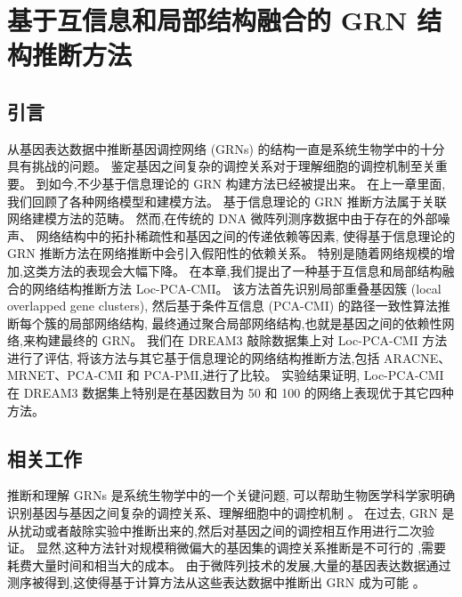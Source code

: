 \section{基于互信息和局部结构融合的 GRN 结构推断方法}
\label{sec:locpcacmi}

\subsection{引言}

从基因表达数据中推断基因调控网络 (GRNs) 的结构一直是系统生物学中的十分具有挑战的问题。
鉴定基因之间复杂的调控关系对于理解细胞的调控机制至关重要。
到如今,不少基于信息理论的 GRN 构建方法已经被提出来。
在上一章里面, 我们回顾了各种网络模型和建模方法。
基于信息理论的 GRN 推断方法属于关联网络建模方法的范畴。
然而,在传统的 DNA 微阵列测序数据中由于存在的外部噪声、
网络结构中的拓扑稀疏性和基因之间的传递依赖等因素,
使得基于信息理论的 GRN 推断方法在网络推断中会引入假阳性的依赖关系。
特别是随着网络规模的增加,这类方法的表现会大幅下降。
在本章,我们提出了一种基于互信息和局部结构融合的网络结构推断方法 Loc-PCA-CMI。
该方法首先识别局部重叠基因簇 (local overlapped gene clusters),
然后基于条件互信息 (PCA-CMI) 的路径一致性算法推断每个簇的局部网络结构,
最终通过聚合局部网络结构,也就是基因之间的依赖性网络,来构建最终的 GRN。
我们在 DREAM3 敲除数据集上对 Loc-PCA-CMI 方法进行了评估,
将该方法与其它基于信息理论的网络结构推断方法,包括 ARACNE、MRNET、PCA-CMI 和 PCA-PMI,进行了比较。
实验结果证明, Loc-PCA-CMI 在 DREAM3 数据集上特别是在基因数目为 50 和 100 的网络上表现优于其它四种方法。

\subsection{相关工作}
\label{subsec:relatedwork}

推断和理解 GRNs 是系统生物学中的一个关键问题, 
可以帮助生物医学科学家明确识别基因与基因之间复杂的调控关系、理解细胞中的调控机制 。
在过去, GRN 是从扰动或者敲除实验中推断出来的,然后对基因之间的调控相互作用进行二次验证。
显然,这种方法针对规模稍微偏大的基因集的调控关系推断是不可行的 ,需要耗费大量时间和相当大的成本。
由于微阵列技术的发展,大量的基因表达数据通过测序被得到,这使得基于计算方法从这些表达数据中推断出 GRN 成为可能 。


